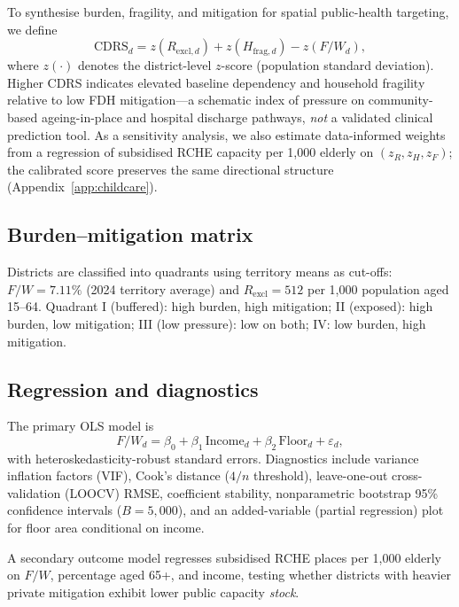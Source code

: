 \documentclass[11pt,a4paper]{article}
\begin{document}
To synthesise burden, fragility, and mitigation for spatial public-health targeting, we define
\begin{equation}
  \mathrm{CDRS}_d = z(R_{\mathrm{excl},d}) + z(H_{\mathrm{frag},d}) - z(F/W_d),
\end{equation}
where $z(\cdot)$ denotes the district-level $z$-score (population standard deviation). Higher CDRS indicates elevated baseline dependency and household fragility relative to low FDH mitigation---a schematic index of pressure on community-based ageing-in-place and hospital discharge pathways, \emph{not} a validated clinical prediction tool. As a sensitivity analysis, we also estimate data-informed weights from a regression of subsidised RCHE capacity per 1{,}000 elderly on $(z_R, z_H, z_F)$; the calibrated score preserves the same directional structure (Appendix~\ref{app:childcare}).

\subsection{Burden--mitigation matrix}

Districts are classified into quadrants using territory means as cut-offs: $F/W = 7.11\%$ (2024 territory average) and $R_{\mathrm{excl}} = 512$ per 1{,}000 population aged 15--64. Quadrant I (buffered): high burden, high mitigation; II (exposed): high burden, low mitigation; III (low pressure): low on both; IV: low burden, high mitigation.

\subsection{Regression and diagnostics}

The primary OLS model is
\begin{equation}
  F/W_d = \beta_0 + \beta_1 \,\mathrm{Income}_d + \beta_2 \,\mathrm{Floor}_d + \varepsilon_d,
\end{equation}
with heteroskedasticity-robust standard errors. Diagnostics include variance inflation factors (VIF), Cook's distance ($4/n$ threshold), leave-one-out cross-validation (LOOCV) RMSE, coefficient stability, nonparametric bootstrap 95\% confidence intervals ($B{=}5{,}000$), and an added-variable (partial regression) plot for floor area conditional on income.

A secondary outcome model regresses subsidised RCHE places per 1{,}000 elderly on $F/W$, percentage aged 65+, and income, testing whether districts with heavier private mitigation exhibit lower public capacity \emph{stock}.
\end{document}
